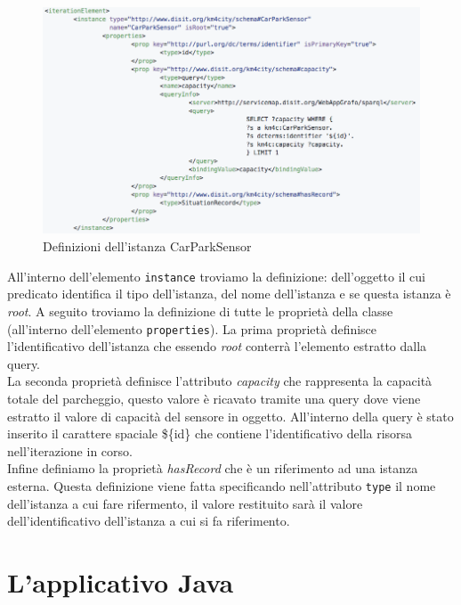 \documentclass[12pt,a4paper,italian]{article}
\begin{document}
\begin{figure}[h!]
	\centering
	\includegraphics[width=14cm]{img/esempio_p2.png}
	\caption{Definizioni dell'istanza CarParkSensor}\label{esempio2}
\end{figure}
All'interno dell'elemento \texttt{instance} troviamo la definizione: dell'oggetto il cui predicato identifica il tipo dell'istanza, del nome dell'istanza e se questa istanza è \emph{root}.
A seguito troviamo la definizione di tutte le proprietà della classe (all'interno dell'elemento \texttt{properties}).
La prima proprietà definisce l'identificativo dell'istanza che essendo \emph{root} conterrà l'elemento estratto dalla query.\\
La seconda proprietà definisce l'attributo \emph{capacity} che rappresenta la capacità totale del parcheggio, questo valore è ricavato tramite una query dove viene estratto il valore di capacità del sensore in oggetto. All'interno della query è stato inserito il carattere spaciale \$\{id\} che contiene l'identificativo della risorsa nell'iterazione in corso.\\
Infine definiamo la proprietà \emph{hasRecord} che è un riferimento ad una istanza esterna. Questa definizione viene fatta specificando nell'attributo \texttt{type} il nome dell'istanza a cui fare rifermento, il valore restituito sarà il valore dell'identificativo dell'istanza a cui si fa riferimento.
\newpage
\section{L'applicativo Java}
\end{document}
